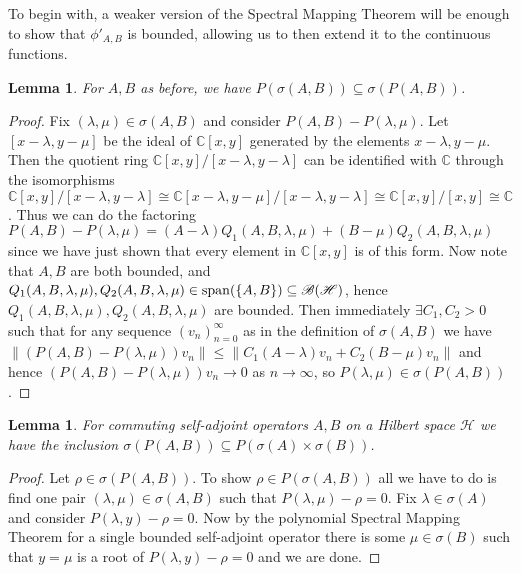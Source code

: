 \documentclass[12pt,oneside]{report}
\newtheorem{lem}[thm]{Lemma}
\begin{document}
To begin with, a weaker version of the Spectral Mapping Theorem will be enough to show that $\phi'_{A,B}$ is bounded, allowing us to then extend it to the continuous functions.

\begin{lem}\label{psigma-sigmap}
    For $A,B$ as before, we have $P(\sigma(A,B)) \subseteq \sigma(P(A,B))$.
\end{lem}
\begin{proof}
    Fix $(\lambda,\mu) \in \sigma(A,B)$ and consider $P(A,B) - P(\lambda, \mu)$. Let $[x - \lambda, y - \mu]$ be the ideal of $\mathbb{C}[x, y]$ generated by the elements $x - \lambda, y - \mu$. Then the quotient ring $\mathbb{C}[x,y]/[x - \lambda, y - \lambda]$ can be identified with $\mathbb{C}$ through the isomorphisms $\mathbb{C}[x,y]/[x - \lambda, y - \lambda] \cong \mathbb{C}[x - \lambda, y - \mu]/[x - \lambda, y - \lambda] \cong \mathbb{C}[x,y]/[x, y] \cong \mathbb{C}$. Thus we can do the factoring $P(A,B) - P(\lambda, \mu) = (A - \lambda)Q_{1}(A,B,\lambda,\mu) + (B - \mu)Q_{2}(A,B,\lambda,\mu)$ since we have just shown that every element in $\mathbb{C}[x,y]$ is of this form. Now note that $A,B$ are both bounded, and $Q_{1}(A,B,\lambda,\mu), Q_{2}(A,B,\lambda,\mu) \in \mathrm{span}(\{ A,B \}) \subseteq \mathscr{B}(\mathscr{H})$, hence $Q_{1}(A,B,\lambda,\mu),Q_{2}(A,B,\lambda,\mu)$ are bounded. Then immediately $\exists C_{1},C_{2} > 0$ such that for any sequence $(v_{n})_{n=0}^{\infty}$ as in the definition of $\sigma(A,B)$ we have $\|(P(A,B) - P(\lambda,\mu))v_{n}\| \leq \|C_{1}(A-\lambda)v_{n} + C_{2}(B-\mu)v_{n}\|$ and hence $(P(A,B) - P(\lambda,\mu))v_{n} \to 0$ as $n \to \infty$, so $P(\lambda,\mu) \in \sigma(P(A,B))$.
\end{proof}

\begin{lem}\label{sigmap-psigma}
    For commuting self-adjoint operators $A,B$ on a Hilbert space $\mathscr{H}$ we have the inclusion $\sigma(P(A,B)) \subseteq P(\sigma(A) \times \sigma(B))$.
\end{lem}
\begin{proof}
    Let $\rho \in \sigma(P(A,B))$. To show $\rho \in P(\sigma(A,B))$ all we have to do is find one pair $(\lambda,\mu) \in \sigma(A,B)$ such that $P(\lambda,\mu) - \rho = 0$. Fix $\lambda \in \sigma(A)$ and consider $P(\lambda,y) - \rho = 0$. Now by the polynomial Spectral Mapping Theorem for a single bounded self-adjoint operator there is some $\mu \in \sigma(B)$ such that $y = \mu$ is a root of $P(\lambda,y) - \rho = 0$ and we are done.
\end{proof}
\end{document}
